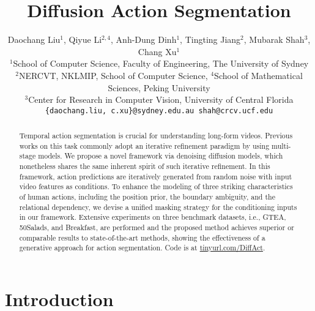 \documentclass[10pt,twocolumn,letterpaper]{article}
\begin{document}
\title{Diffusion Action Segmentation}

\author{
    Daochang Liu$^1$, 
    Qiyue Li$^{2,4}$, 
    Anh-Dung Dinh$^1$, 
    Tingting Jiang$^2$, 
    Mubarak Shah$^3$, 
    Chang Xu$^1$
    \vspace{3pt}\\
    $^1$School of Computer Science, Faculty of Engineering, The University of Sydney\\
    $^2$NERCVT, NKLMIP, School of Computer Science, $^4$School of Mathematical Sciences, Peking University\\
    $^3$Center for Research in Computer Vision, University of Central Florida\\
    {\tt\small \{daochang.liu, c.xu\}@sydney.edu.au \quad shah@crcv.ucf.edu} \\
}

\maketitle
\ificcvfinal\thispagestyle{empty}\fi


\begin{abstract}
Temporal action segmentation is crucial for understanding long-form videos.
Previous works on this task commonly adopt an iterative refinement paradigm by using multi-stage models. 
We propose a novel framework via denoising diffusion models, which nonetheless shares the same inherent spirit of such iterative refinement.
In this framework, action predictions are iteratively generated from random noise with input video features as conditions.
To enhance the modeling of three striking characteristics of human actions, including the position prior, the boundary ambiguity, and the relational dependency, we devise a unified masking strategy for the conditioning inputs in our framework.
Extensive experiments on three benchmark datasets, i.e., GTEA, 50Salads, and Breakfast, are performed and the proposed method achieves superior or comparable results to state-of-the-art methods, showing the effectiveness of a generative approach for action segmentation.
Code is at \href{https://tinyurl.com/DiffAct}{tinyurl.com/DiffAct}.
\end{abstract}


\section{Introduction}
\end{document}

